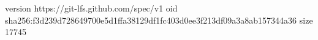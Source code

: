 version https://git-lfs.github.com/spec/v1
oid sha256:f3d239d728649700e5d1ffa38129df1fc403d0ee3f213df09a3a8ab157344a36
size 17745
